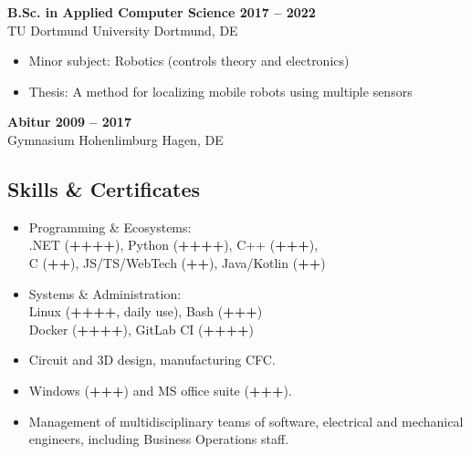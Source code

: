\documentclass[a4paper,11pt]{article}
\newcommand{\subsectionskip}[0]{\vspace{0.125cm}}
\newcommand{\col}[2]{\textcolor[HTML]{#1}{#2}}
\begin{document}
\begin{minipage}[t]{0.65\textwidth}
    \subsectionskip

    \col{72788a}{\textbf{B.Sc. in Applied Computer Science \hfill 2017 -- 2022}} \\
    TU Dortmund University \hfill Dortmund, DE
    \begin{itemize}
        \small
        \item Minor subject: Robotics (controls theory and electronics)
        \item Thesis: A method for localizing mobile robots using multiple sensors
    \end{itemize}

    \subsectionskip

    \col{72788a}{\textbf{Abitur \hfill 2009 -- 2017}} \\
    Gymnasium Hohenlimburg \hfill Hagen, DE

    \vspace{-0.5cm} %

    \begin{minipage}[t]{0.625\textwidth}
        \col{6c84ac}{\section*{Skills \& Certificates}}
        \begin{itemize}
            \small
            \item Programming \& Ecosystems:\\
            .NET (\textbf{++++}), Python (\textbf{++++}), C++ (\textbf{+++}),\\
            C (\textbf{++}), JS/TS/WebTech (\textbf{++}), Java/Kotlin (\textbf{++})

            \item Systems \& Administration:\\
            Linux (\textbf{++++}, daily use), Bash (\textbf{+++}) \\
            Docker (\textbf{++++}), GitLab CI (\textbf{++++})

            \item Circuit and 3D design, manufacturing CFC.

            \item Windows (\textbf{+++}) and MS office suite (\textbf{+++}).

            \item Management of multidisciplinary teams of software, electrical and mechanical engineers, including Business Operations staff.


\end{itemize}
\end{minipage}
\end{minipage}
\end{document}

